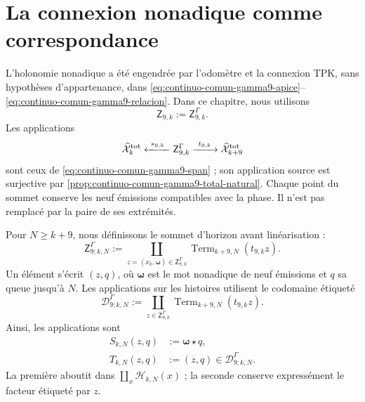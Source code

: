 \section{La connexion nonadique comme correspondance}

L'holonomie nonadique a été engendrée par l'odomètre et la connexion TPK, sans hypothèses d'appartenance, dans \eqref{eq:continuo-comun-gamma9-apice}--\eqref{eq:continuo-comun-gamma9-relacion}. Dans ce chapitre, nous utilisons
\begin{equation}
\label{eq:pdfv2-terminal-apice-gamma9}
 \mathsf Z_{9,k}:=\mathsf Z^{\Gamma}_{9,k}.
\end{equation}
Les applications
\begin{equation}
\label{eq:pdfv2-terminal-span-gamma9}
 \widehat{\mathcal X}^{\rm tot}_k
 \xleftarrow{\ s_{9,k}\ }
 \mathsf Z^{\Gamma}_{9,k}
 \xrightarrow{\ t_{9,k}\ }
 \widehat{\mathcal X}^{\rm tot}_{k+9}
\end{equation}
sont ceux de \eqref{eq:continuo-comun-gamma9-span} ; son application source est surjective par \cref{prop:continuo-comun-gamma9-total-natural}. Chaque point du sommet conserve les neuf émissions compatibles avec la phase. Il n'est pas remplacé par la paire de ses extrémités.

Pour \(N\geq k+9\), nous définissons le sommet d'horizon avant linéarisation :
\begin{equation}
\label{eq:pdfv2-terminal-apice-horizonte-gamma9}
 \mathsf Z^\Gamma_{9;k,N}:=
 \coprod_{z=(\widehat x_k,\boldsymbol\omega)
            \in\mathsf Z^\Gamma_{9,k}}
 \operatorname{Term}_{k+9,N}(t_{9,k}z).
\end{equation}
Un élément s'écrit \((z,q)\), où \(\boldsymbol\omega\) est le mot nonadique de neuf émissions et \(q\) sa queue jusqu'à \(N\). Les applications sur les histoires utilisent le codomaine étiqueté
\begin{equation}
\label{eq:pdfv2-terminal-gamma9-codominio-colas}
 \mathscr D^\Gamma_{9;k,N}:=
 \coprod_{z\in\mathsf Z^\Gamma_{9,k}}
 \operatorname{Term}_{k+9,N}(t_{9,k}z).
\end{equation}
Ainsi, les applications sont
\begin{align}
 S_{k,N}(z,q)&:=\boldsymbol\omega\star q,
 \label{eq:pdfv2-terminal-gamma9-s-horizonte}\\
 T_{k,N}(z,q)&:=(z,q)\in\mathscr D^\Gamma_{9;k,N}.
 \label{eq:pdfv2-terminal-gamma9-t-horizonte}
\end{align}
La première aboutit dans \(\coprod_x\mathscr H_{k,N}(x)\) ; la seconde conserve expressément le facteur étiqueté par \(z\).

